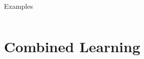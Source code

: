 \documentclass[17pt, t, lualatex]{beamer}
\begin{document}
\begin{frame}{Examples}
	\begin{columns}
		\begin{column}{0.45\textwidth}
		\end{column}
		\begin{column}{0.45\textwidth}
		\end{column}
	\end{columns}
\end{frame}


\section{Combined Learning}\insertsectionpage
\end{document}
